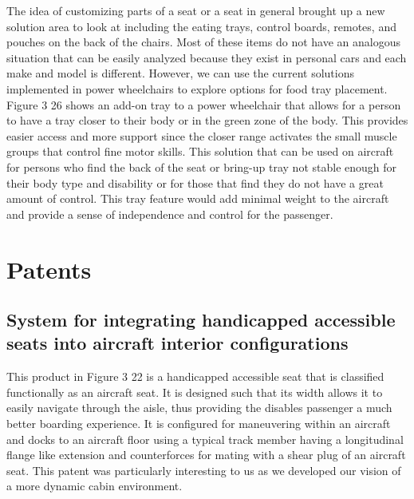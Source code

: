 The idea of customizing parts of a seat or a seat in general brought up a new solution area to look at including the eating trays, control boards, remotes, and pouches on the back of the chairs. Most of these items do not have an analogous situation that can be easily analyzed because they exist in personal cars and each make and model is different. However, we can use the current solutions implemented in power wheelchairs to explore options for food tray placement.  Figure 3 26 shows an add-on tray to a power wheelchair that allows for a person to have a tray closer to their body or in the green zone of the body.  This provides easier access and more support since the closer range activates the small muscle groups that control fine motor skills.  This solution that can be used on aircraft for persons who find the back of the seat or bring-up tray not stable enough for their body type and disability or for those that find they do not have a great amount of control.  This tray feature would add minimal weight to the aircraft and provide a sense of independence and control for the passenger. 

\section*{Patents}
\subsection{System for integrating handicapped accessible seats into aircraft interior configurations}
This product in Figure 3 22 is a handicapped accessible seat that is classified functionally as an aircraft seat. It is designed such that its width allows it to easily navigate through the aisle, thus providing the disables passenger a much better boarding experience. It is configured for maneuvering within an aircraft and docks to an aircraft floor using a typical track member having a longitudinal flange like extension and counterforces for mating with a shear plug of an aircraft seat.  This patent was particularly interesting to us as we developed our vision of a more dynamic cabin environment.

